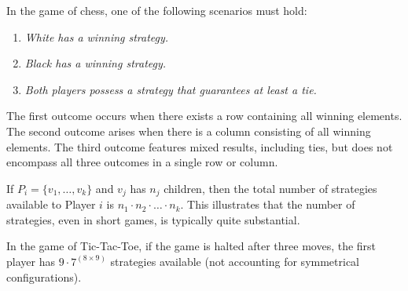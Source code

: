 \begin{theorem}
    In the game of chess, one of the following scenarios must hold: 
\end{theorem}
\begin{enumerate}
    \item \textit{White has a winning strategy.}
    \item \textit{Black has a winning strategy.}
    \item \textit{Both players possess a strategy that guarantees at least a tie.}
\end{enumerate}
The first outcome occurs when there exists a row containing all winning elements. 
The second outcome arises when there is a column consisting of all winning elements. 
The third outcome features mixed results, including ties, but does not encompass all three outcomes in a single row or column.

If $P_i = \{v_1, \dots, v_k \}$ and $v_j$ has $n_j$ children, then the total number of strategies available to Player $i$ is $n_1 \cdot n_2 \cdot \dots \cdot n_k$. 
This illustrates that the number of strategies, even in short games, is typically quite substantial.
\begin{example}
    In the game of Tic-Tac-Toe, if the game is halted after three moves, the first player has $9 \cdot 7 ^{(8\times9)}$ strategies available (not accounting for symmetrical configurations).
\end{example}